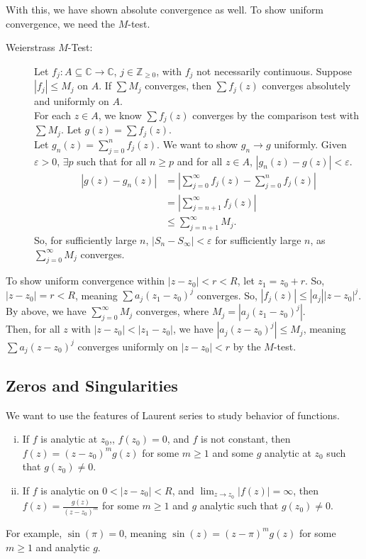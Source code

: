 \documentclass[10pt]{extarticle}
\newcommand{\Z}{\mathbb{Z}}
\newcommand{\C}{\mathbb{C}}
\begin{document}
  With this, we have shown absolute convergence as well. To show uniform convergence, we need the $M$-test.
  \begin{description}
    \item[Weierstrass $M$-Test:] Let $f_j: A\subseteq \C \rightarrow \C$, $j \in \Z_{\geq 0}$, with $f_j$ not necessarily continuous. Suppose $|f_j| \leq M_j$ on $A$. If $\sum M_j$ converges, then $\sum f_j(z)$ converges absolutely and uniformly on $A$.\\

      For each $z\in A$, we know $\sum f_j(z)$ converges by the comparison test with $\sum M_j$. Let $g(z) = \sum f_j(z)$.\\

      Let $g_n(z) = \sum_{j=0}^{n}f_j(z)$. We want to show $g_n \rightarrow g$ uniformly. Given $\varepsilon > 0$, $\exists p$ such that for all $n\geq p$ and for all $z\in A$, $|g_n(z) - g(z)| < \varepsilon$.
      \begin{align*}
        |g(z)-g_n(z)| &= \left|\sum_{j=0}^{\infty}f_j(z)-\sum_{j=0}^{n}f_j(z)\right|\\
                      &= \left|\sum_{j=n+1}^{\infty}f_j(z)\right|\\
                      &\leq \sum_{j=n+1}^{\infty}M_j.
      \end{align*}
      So, for sufficiently large $n$, $|S_n - S_{\infty}| < \varepsilon$ for sufficiently large $n$, as $\sum_{j=0}^{\infty}M_j$ converges.
  \end{description}
  To show uniform convergence within $|z-z_0| < r < R$, let $z_1 = z_0 + r$. So, $|z-z_0| = r < R$, meaning $\sum a_j(z_1-z_0)^j$ converges. So, $|f_j(z)| \leq |a_j||z-z_0|^j$. By above, we have $\sum_{j=0}^{\infty}M_j$ converges, where $M_j = |a_j(z_1-z_0)^j|$.\\

  Then, for all $z$ with $|z-z_0| < |z_1-z_0|$, we have $|a_j(z-z_0)^j| \leq M_j$, meaning $\sum a_j(z-z_0)^j$ converges uniformly on $|z-z_0| < r$ by the $M$-test.
  \subsection{Zeros and Singularities}%
  We want to use the features of Laurent series to study behavior of functions.
  \begin{enumerate}[(i)]
    \item If $f$ is analytic at $z_0$,, $f(z_0) = 0$, and $f$ is not constant, then $f(z) = (z-z_0)^m g(z)$ for some $m\geq 1$ and some $g$ analytic at $z_0$ such that $g(z_0) \neq 0$.
    \item If $f$ is analytic on $0 < |z-z_0| < R$, and $\lim_{z\rightarrow z_0}|f(z)| = \infty$, then $f(z) = \frac{g(z)}{(z-z_0)^m}$ for some $m\geq 1$ and $g$ analytic such that $g(z_0)\neq 0$.
  \end{enumerate}
  For example, $\sin(\pi) = 0$, meaning $\sin(z) = (z-\pi)^mg(z)$ for some $m\geq 1$ and analytic $g$.\\
\end{document}
